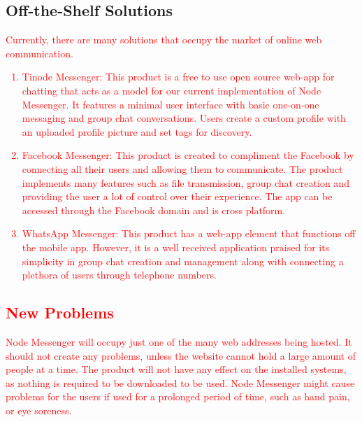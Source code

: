 \documentclass[12pt, titlepage]{article}
\begin{document}
    	\subsection{Off-the-Shelf Solutions}
		\textcolor{red}{Currently, there are many solutions that occupy the market of online web communication.	
	    	
    	\begin{enumerate}
    	    \item Tinode Messenger: \textcolor{red}{This product is a free to use open source web-app for chatting that acts as a model for our current implementation of Node Messenger. It features a minimal user interface with basic one-on-one messaging and group chat conversations. Users create a custom profile with an uploaded profile picture and set tags for discovery.}
    	    \item Facebook Messenger: \textcolor{red}{This product is created to compliment the Facebook by connecting all their users and allowing them to communicate. The product implements many features such as file transmission, group chat creation and providing the user a lot of control over their experience. The app can be accessed through the Facebook domain and is cross platform.}
    	    \item \textcolor{red}{WhatsApp Messenger: This product has a web-app element that functions off the mobile app. However, it is a well received application praised for its simplicity in group chat creation and management along with connecting a plethora of users through telephone numbers.}
    	\end{enumerate}

    	\subsection{New Problems}
    	Node Messenger will occupy just one of the many web addresses being hosted. It should not create any problems, unless the website cannot hold a large amount of people at a time. The product will not have any effect on the installed systems, as nothing is required to be downloaded to be used. Node Messenger might cause problems for the users if used for a prolonged period of time, such as hand pain, or eye soreness. 

}
\end{document}
